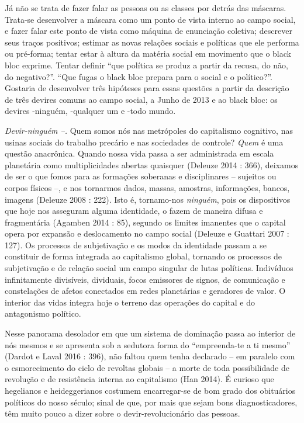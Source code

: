 Já não se trata de fazer falar as pessoas ou as classes por detrás das
máscaras. Trata-se desenvolver a máscara como um ponto de vista interno
ao campo social, e fazer falar este ponto de vista como máquina de
enunciação coletiva; descrever seus traços positivos; estimar as novas
relações sociais e políticas que ele performa ou pré-forma; tentar estar
à altura da matéria social em movimento que o black bloc exprime. Tentar
definir ``que política se produz a partir da recusa, do não, do
negativo?''. ``Que fugas o black bloc prepara para o social e o
político?''. Gostaria de desenvolver três hipóteses para essas questões
a partir da descrição de três devires comuns ao campo social, a Junho de
2013 e ao black bloc: os devires -ninguém, -qualquer um e -todo mundo.

\emph{Devir-ninguém --. }Quem somos nós nas metrópoles do capitalismo
cognitivo, nas usinas sociais do trabalho precário e nas sociedades de
controle? \emph{Quem} é uma questão anacrônica. Quando nossa vida passa
a ser administrada em escala planetária como multiplicidades abertas
quaisquer (Deleuze 2014 : 366), deixamos de ser o que fomos para as
formações soberanas e disciplinares -- sujeitos ou corpos físicos --, e
nos tornarmos dados, massas, amostras, informações, bancos, imagens
(Deleuze 2008 : 222). Isto é, tornamo-nos \emph{ninguém}, pois os
dispositivos que hoje nos asseguram alguma identidade, o fazem de
maneira difusa e fragmentária (Agamben 2014 : 85), segundo os limites
imanentes que o capital opera por expansão e deslocamento no campo
social (Deleuze e Guattari 2007 : 127). Os processos de subjetivação e
os modos da identidade passam a se constituir de forma integrada ao
capitalismo global, tornando os processos de subjetivação e de relação
social um campo singular de lutas políticas. Indivíduos infinitamente
divisíveis, dividuais, focos emissores de signos, de comunicação e
constelações de afetos conectados em redes planetárias e geradores de
valor. O interior das vidas integra hoje o terreno das operações do
capital e do antagonismo político.

Nesse panorama desolador em que um sistema de dominação passa ao
interior de nós mesmos e se apresenta sob a sedutora forma do
``empreenda-te a ti mesmo'' (Dardot e Laval 2016 : 396), não faltou quem
tenha declarado -- em paralelo com o esmorecimento do ciclo de revoltas
globais -- a morte de toda possibilidade de revolução e de resistência
interna ao capitalismo (Han 2014). É curioso que hegelianos e
heideggerianos costumem encarregar-se de bom grado dos obituários
políticos do nosso século; sinal de que, por mais que sejam bons
diagnosticadores, têm muito pouco a dizer sobre o devir-revolucionário
das pessoas.

